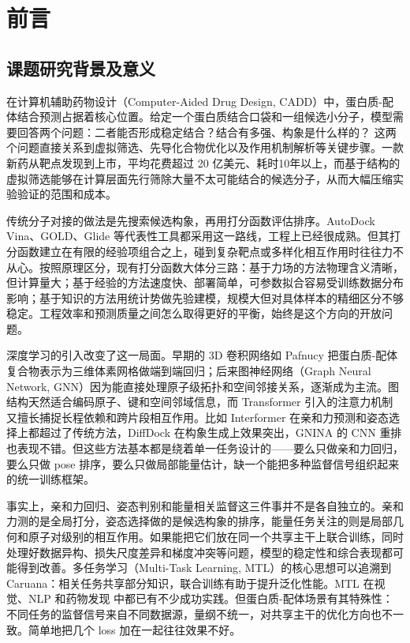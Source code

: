 
\section{前言}
\subsection{课题研究背景及意义}

在计算机辅助药物设计（Computer-Aided Drug Design, CADD）中，蛋白质-配体结合预测占据着核心位置。给定一个蛋白质结合口袋和一组候选小分子，模型需要回答两个问题：二者能否形成稳定结合？结合有多强、构象是什么样的？\cite{trott2010autodock,ginosar2023survey} 这两个问题直接关系到虚拟筛选、先导化合物优化以及作用机制解析等关键步骤。一款新药从靶点发现到上市，平均花费超过 20 亿美元、耗时10年以上，而基于结构的虚拟筛选能够在计算层面先行筛除大量不太可能结合的候选分子，从而大幅压缩实验验证的范围和成本。

传统分子对接的做法是先搜索候选构象，再用打分函数评估排序。AutoDock Vina\cite{trott2010autodock}、GOLD\cite{verdonk2003gold}、Glide 等代表性工具都采用这一路线，工程上已经很成熟。但其打分函数建立在有限的经验项组合之上，碰到复杂靶点或多样化相互作用时往往力不从心\cite{ginosar2023survey}。按照原理区分，现有打分函数大体分三路\cite{trott2010autodock}：基于力场的方法物理含义清晰，但计算量大；基于经验的方法速度快、部署简单，可参数拟合容易受训练数据分布影响；基于知识的方法用统计势做先验建模，规模大但对具体样本的精细区分不够稳定。工程效率和预测质量之间怎么取得更好的平衡，始终是这个方向的开放问题\cite{tropsha2010best}。

深度学习的引入改变了这一局面。早期的 3D 卷积网络如 Pafnucy\cite{stepniewska2018pafnucy} 把蛋白质-配体复合物表示为三维体素网格做端到端回归；后来图神经网络（Graph Neural Network, GNN）因为能直接处理原子级拓扑和空间邻接关系，逐渐成为主流\cite{gilmer2017neural,moon2022pignet}。图结构天然适合编码原子、键和空间邻域信息，而 Transformer 引入的注意力机制又擅长捕捉长程依赖和跨片段相互作用\cite{vaswani2017attention,ying2021transformers}。比如 Interformer\cite{lai2024interformer} 在亲和力预测和姿态选择上都超过了传统方法，DiffDock\cite{corso2023diffdock} 在构象生成上效果突出，GNINA\cite{mcnutt2021gnina} 的 CNN 重排也表现不错。但这些方法基本都是绕着单一任务设计的——要么只做亲和力回归，要么只做 pose 排序，要么只做局部能量估计，缺一个能把多种监督信号组织起来的统一训练框架。

事实上，亲和力回归、姿态判别和能量相关监督这三件事并不是各自独立的。亲和力测的是全局打分，姿态选择做的是候选构象的排序，能量任务关注的则是局部几何和原子对级别的相互作用。如果能把它们放在同一个共享主干上联合训练，同时处理好数据异构、损失尺度差异和梯度冲突等问题，模型的稳定性和综合表现都可能得到改善。多任务学习（Multi-Task Learning, MTL）的核心思想可以追溯到 Caruana\cite{caruana1997multitask}：相关任务共享部分知识，联合训练有助于提升泛化性能。MTL 在视觉\cite{kendall2018multi,liu2019end}、NLP 和药物发现\cite{wu2018moleculenet} 中都已有不少成功实践。但蛋白质-配体场景有其特殊性：不同任务的监督信号来自不同数据源，量纲不统一，对共享主干的优化方向也不一致。简单地把几个 loss 加在一起往往效果不好\cite{ruder2017overview,zhang2021survey}。

